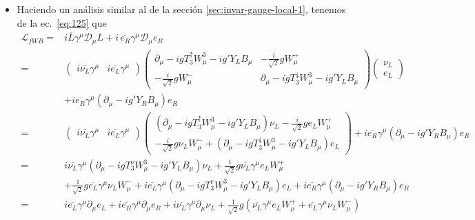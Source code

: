 \begin{itemize}
\item[\ref{cha:modelo-estandar}.~\ref{item:chap6.1}.] 
Haciendo un an\'alisis similar al de la secci\'on \ref{sec:invar-gauge-local-1}, tenemos de la ec.~\eqref{eq:125} que
\begin{align}
 \mathcal{L}_{fWB}=&i\overline{L}\gamma^\mu\mathcal{D}_\mu L+i\,\overline{e_R}\gamma^\mu\mathcal{D}_\mu e_R  \nonumber\\
=&\begin{pmatrix} 
  i\overline{\nu_L}\gamma^\mu& i\overline{e_L}\gamma^\mu
\end{pmatrix}\begin{pmatrix}
    \partial_\mu-igT_3^\uparrow W^3_\mu-ig'Y_LB_\mu&-\frac{i}{\sqrt{2}}gW^+_\mu\\
    -\frac{i}{\sqrt{2}}gW^-_\mu&\partial_\mu-igT_3^\downarrow W^3_\mu-ig'Y_LB_\mu
  \end{pmatrix}
  \begin{pmatrix}
    \nu_L\\e_L    
  \end{pmatrix}\nonumber\\
&+i\overline{e_R}\gamma^\mu(\partial_\mu-ig'Y_R B_\mu)e_R\nonumber\\
=&\begin{pmatrix} 
  i\overline{\nu_L}\gamma^\mu& i\overline{e_L}\gamma^\mu
\end{pmatrix} 
  \begin{pmatrix}
    (\partial_\mu-igT_3^\uparrow W^3_\mu-ig'Y_LB_\mu)\nu_L-\frac{i}{\sqrt{2}}ge_LW^+_\mu\\
    -\frac{i}{\sqrt{2}}g\nu_LW^-_\mu+(\partial_\mu-igT_3^\downarrow W^3_\mu-ig'Y_LB_\mu)e_L
  \end{pmatrix}+i\overline{e_R}\gamma^\mu(\partial_\mu-ig'Y_R B_\mu)e_R\nonumber\\
=&i\overline{\nu_L}\gamma^\mu(\partial_\mu-igT_3^\nu W^3_\mu-ig'Y_LB_\mu)\nu_L+\frac{1}{\sqrt{2}}g\overline{\nu_L}\gamma^\mu e_LW^+_\mu\nonumber\\
&+\frac{1}{\sqrt{2}}g\overline{e_L}\gamma^\mu\nu_LW^-_\mu+i\overline{e_L}\gamma^\mu(\partial_\mu-igT_3^eW^3_\mu-ig'Y_LB_\mu)e_L
+i\overline{e_R}\gamma^\mu(\partial_\mu-ig'Y_R B_\mu)e_R\nonumber\\
=&i\overline{e_L}\gamma^\mu\partial_\mu e_L+i\overline{e_R}\gamma^\mu\partial_\mu e_R+i\overline{\nu_L}\gamma^\mu\partial_\mu\nu_L
+\frac{1}{\sqrt{2}}g\left(\overline{\nu_L}\gamma^\mu e_LW^+_\mu+\overline{e_L}\gamma^\mu\nu_LW^-_\mu\right)\nonumber\\

\end{align}
\end{itemize}
